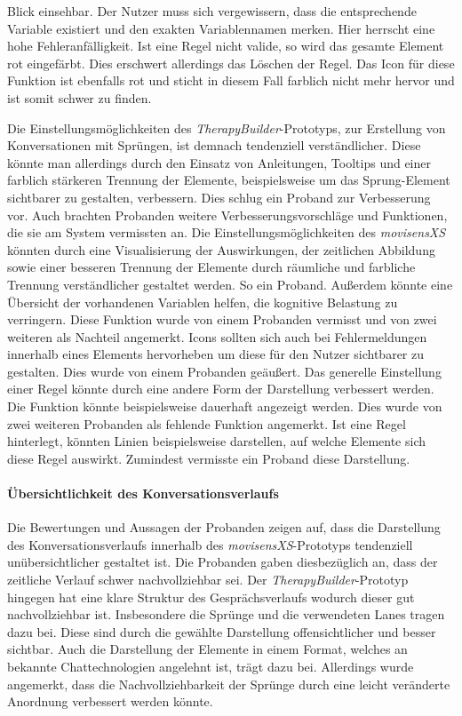 Blick einsehbar. Der Nutzer muss sich vergewissern, dass die entsprechende Variable existiert und den exakten Variablennamen merken. Hier herrscht eine hohe Fehleranfälligkeit. Ist eine Regel nicht valide, so wird das gesamte Element rot eingefärbt. Dies erschwert allerdings das Löschen der Regel. Das Icon für diese Funktion ist ebenfalls rot und sticht in diesem Fall farblich nicht mehr hervor und ist somit schwer zu finden.

Die Einstellungsmöglichkeiten des \emph{TherapyBuilder}-Prototyps, zur Erstellung von Konversationen mit Sprüngen, ist demnach tendenziell verständlicher. Diese könnte man allerdings durch den Einsatz von Anleitungen, Tooltips und einer farblich stärkeren Trennung der Elemente, beispielsweise um das Sprung-Element sichtbarer zu gestalten, verbessern. Dies schlug ein Proband zur Verbesserung vor. Auch brachten Probanden weitere Verbesserungsvorschläge und Funktionen, die sie am System vermissten an. Die Einstellungsmöglichkeiten des \emph{movisensXS} könnten durch eine Visualisierung der Auswirkungen, der zeitlichen Abbildung sowie einer besseren Trennung der Elemente durch räumliche und farbliche Trennung verständlicher gestaltet werden. So ein Proband. Außerdem könnte eine Übersicht der vorhandenen Variablen helfen, die kognitive Belastung zu verringern. Diese Funktion wurde von einem Probanden vermisst und von zwei weiteren als Nachteil angemerkt. Icons sollten sich auch bei Fehlermeldungen innerhalb eines Elements hervorheben um diese für den Nutzer sichtbarer zu gestalten. Dies wurde von einem Probanden geäußert. Das generelle Einstellung einer Regel könnte durch eine andere Form der Darstellung verbessert werden. Die Funktion könnte beispielsweise dauerhaft angezeigt werden. Dies wurde von zwei weiteren Probanden als fehlende Funktion angemerkt. Ist eine Regel hinterlegt, könnten Linien beispielsweise darstellen, auf welche Elemente sich diese Regel auswirkt. Zumindest vermisste ein Proband diese Darstellung.


\paragraph{Übersichtlichkeit des Konversationsverlaufs}
Die Bewertungen und Aussagen der Probanden zeigen auf, dass die Darstellung des Konversationsverlaufs innerhalb des \emph{movisensXS}-Prototyps tendenziell unübersichtlicher gestaltet ist. Die Probanden gaben diesbezüglich an, dass der zeitliche Verlauf schwer nachvollziehbar sei. Der \emph{TherapyBuilder}-Prototyp hingegen hat eine klare Struktur des Gesprächsverlaufs wodurch dieser gut nachvollziehbar ist. Insbesondere die Sprünge und die verwendeten Lanes tragen dazu bei. Diese sind durch die gewählte Darstellung offensichtlicher und besser sichtbar. Auch die Darstellung der Elemente in einem Format, welches an bekannte Chattechnologien angelehnt ist, trägt dazu bei. Allerdings wurde angemerkt, dass die Nachvollziehbarkeit der Sprünge durch eine leicht veränderte Anordnung verbessert werden könnte.


